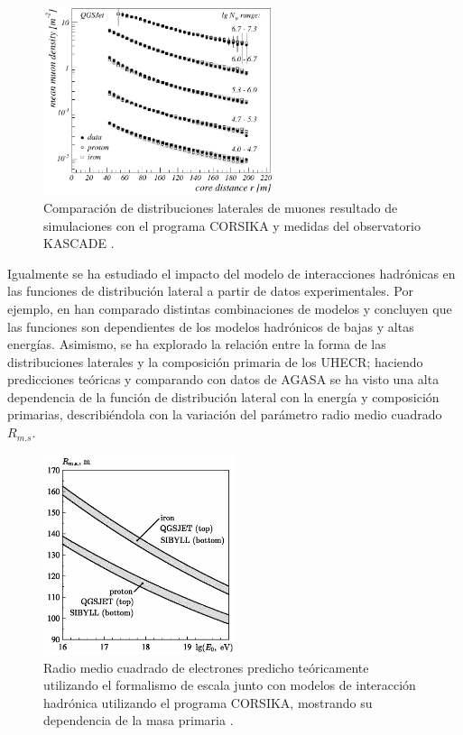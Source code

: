 \begin{figure}[]
\centering
\includegraphics[width=0.6\textwidth]{Figuras/Apel2005} 
\caption{Comparación de distribuciones laterales de muones resultado de simulaciones con el programa CORSIKA y medidas del observatorio KASCADE \cite{Apel2005}.}
\label{fig:Apel}
\end{figure}


Igualmente se ha estudiado el impacto del modelo de interacciones hadrónicas en las funciones de distribución lateral a partir de datos experimentales. Por ejemplo, en \cite{Drescher2003} han comparado distintas combinaciones de modelos y concluyen que las funciones son dependientes de los modelos hadrónicos de bajas y altas energías. Asimismo, se ha explorado la relación entre la forma de las distribuciones laterales y la composición primaria de los UHECR; haciendo predicciones teóricas \cite{Raikin2001} y comparando con datos de AGASA se ha visto una alta dependencia de la función de distribución lateral con la energía y composición primarias, describiéndola con la variación del parámetro radio medio cuadrado $R_{m.s}$. \\

\begin{figure}[]
\centering
\includegraphics[width=0.5\textwidth]{Figuras/Raikin2001}
\caption{Radio medio cuadrado de electrones predicho teóricamente utilizando el formalismo de escala junto con modelos de interacción hadrónica utilizando el programa CORSIKA, mostrando su dependencia de la masa primaria \cite{Raikin2001}.}
\label{fig:Raikin}
\end{figure}

